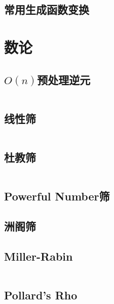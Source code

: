 \documentclass[a4paper, twoside]{article}
\begin{document}
\begin{multicols}{2}
			\subsection{常用生成函数变换}
				


		\section{数论}

			\subsection{$O(n)$预处理逆元}
				\inputminted{cpp}{../src/numbertheory/O(n)求逆元.cpp}

			\subsection{线性筛}
				\inputminted{cpp}{../src/numbertheory/扩展线性筛.cpp}

			\subsection{杜教筛}
				\inputminted{cpp}{../src/numbertheory/杜教筛.cpp}
			
			\subsection{Powerful Number筛}
				

			\subsection{洲阁筛}
				


			\subsection{Miller-Rabin}
				\inputminted{cpp}{../src/numbertheory/Miller-Rabin.cpp}

			\subsection{Pollard's Rho}
				\inputminted{cpp}{../src/numbertheory/Pollard-Rho.cpp}
			

\end{multicols}
\end{document}
